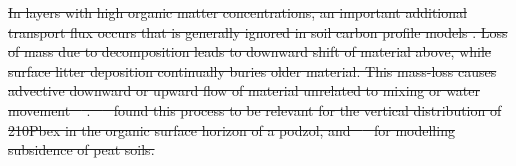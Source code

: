 \documentclass[11pt, oneside, a4paper]{article}   	%
\providecommand{\DIFdeltex}[1]{{\protect\color{red}\sout{#1}}}                      %
\providecommand{\DIFdelbegin}{} %
\providecommand{\DIFdel}[1]{\texorpdfstring{\DIFdeltex{#1}}{}} %
\newcommand{\DIFscaledelfig}{0.5}
\newlength{\DIFdelgraphicswidth} %
\newlength{\DIFdelgraphicsheight} %
\newcommand{\DIFdelincludegraphics}[2][]{%
\sbox{\DIFdelgraphicsbox}{\DIFOincludegraphics[#1]{#2}}%
\settoboxwidth{\DIFdelgraphicswidth}{\DIFdelgraphicsbox} %
\settoboxtotalheight{\DIFdelgraphicsheight}{\DIFdelgraphicsbox} %
\scalebox{\DIFscaledelfig}{%
\parbox[b]{\DIFdelgraphicswidth}{\usebox{\DIFdelgraphicsbox}\\[-\baselineskip] \rule{\DIFdelgraphicswidth}{0em}}\llap{\resizebox{\DIFdelgraphicswidth}{\DIFdelgraphicsheight}{%
\setlength{\unitlength}{\DIFdelgraphicswidth}%
\begin{picture}(1,1)%
\thicklines\linethickness{2pt} %
{\color[rgb]{1,0,0}\put(0,0){\framebox(1,1){}}}%
{\color[rgb]{1,0,0}\put(0,0){\line( 1,1){1}}}%
{\color[rgb]{1,0,0}\put(0,1){\line(1,-1){1}}}%
\end{picture}%
}\hspace*{3pt}}} %
} %
\DeclareRobustCommand{\DIFdelbegin}{\DIFOdelbegin \let\includegraphics\DIFdelincludegraphics} %
\begin{document}
\DIFdelbegin \DIFdel{In layers with high organic matter concentrations, an important additional transport flux occurs that is generally ignored in soil carbon profile models . Loss of mass due
to decomposition leads to downward shift of material above, while surface litter deposition continually buries older material. This mass-loss causes advective downward or upward flow
of material unrelated to mixing or water movement \mbox{%
\citep{Ahrens2015}}\hskip0pt%
. \mbox{%
\citep{Kaste2007} }\hskip0pt%
found this
process to be relevant for the vertical distribution of 210Pbex in the organic surface
horizon of a podzol, and \mbox{%
\citet{Hilbert2000} }\hskip0pt%
for modelling subsidence of peat soils. 
}%

\end{document}
